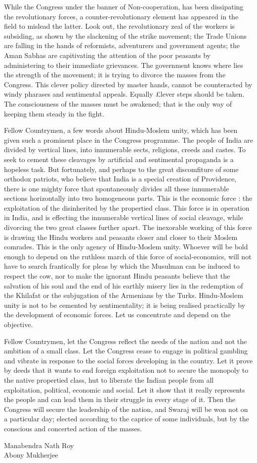 While the Congress under the banner of Non-cooperation, has been dissipating the revolutionary forces, a counter-revolutionary element has appeared in the field to mislead the latter. Look out, the revolutionary zeal of the workers is subsiding, as shown by the slackening of the strike movement; the Trade Unions are falling in the hands of reformists, adventurers and government agents; the Aman Sabhas are 
capitivating the attention of the poor peasants by administering to their immediate grievances. The government knows where lies the strength of the movement; it is trying to divorce the masses from the Congress. This clever policy directed by master hands, cannot be counteracted by windy pharases and sentimental appeals. Equally £lever steps should be taken. The consciousness of the masses must be awakened; that is the only way of keeping them steady in the fight. 

Fellow Countrymen, a few words about Hindu-Moslem unity, which has been given such a prominent place in the Congress programme. The people of India are divided by vertical lines, into innumerable sects, religions, creeds and castes. To seek to cement these cleavages by artificial and 
sentimental propaganda is a hopeless task. But fortunately, and perhaps to the great discomfiture of some orthodox patriots, who believe that India is a special creation of Providence, there is one mighty force that spontaneously divides all these innumerable sections horizontally into two homogeneous parts. This is the economic force : the exploitation of the disinherited by the propertied class. This force is in operation in India, and is effecting the innumerable vertical lines of social cleavage, while divorcing the two great classes further apart. The inexorable working of this force is drawing the Hindu workers and peasants closer and closer to their Moslem comrades. This is the only agency of Hindu-Moslem unity. Whoever will be bold enough to depend on the ruthless march of this force of social-economics, will not have to search frantically for pleas by which the Musulman can be induced to respect the cow, nor to make the ignorant Hindu peasants believe that the salvation of his soul and the end of his earthly misery lies in the redemption of the Khilafat or the subjugation of the Armenians by the Turks. Hindu-Moslem unity is not to be cemented by sentimentality; it is being realised practically by the development of economic forces. Let us concentrate and depend on the objective. 

Fellow Countrymen, let the Congress reflect the needs of the nation and not the ambition of a small class. Let the Congress cease to engage in political gambling and vibrate in response to the social forces developing in the country. Let it prove by deeds that it wants to end foreign exploitation not to secure the monopoly to the native propertied class, hut to liberate the Indian people from all exploitation, political, 
economic and social. Let it show that it really represents the people and can lead them in their struggle in every stage of it. Then the Congress will secure the leadership of the nation, and Swaraj will be won not on a particular day; elected according to the caprice of some individuals, but by the conscious and concerted action of the masses. 

\begin{flushright}
Manabendra Nath Roy\\
Abony Mukherjee
\end{flushright}


